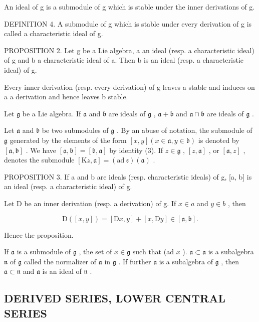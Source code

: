 An ideal of g is a submodule of g which is stable under the inner derivations of g.

DEFINITION 4. A submodule of g which is stable under every derivation of g is called a characteristic ideal of g.

PROPOSITION 2. Let g be a Lie algebra, a an ideal (resp. a characteristic ideal) of g and b a characteristic ideal of a. Then b is an ideal (resp. a characteristic ideal) of g.

Every inner derivation (resp. every derivation) of g leaves a stable and induces on a a derivation and hence leaves b stable.

Let \(\mathfrak{g}\) be a Lie algebra. If \(\mathfrak{a}\) and \(\mathfrak{b}\) are ideals of \(\mathfrak{g}\) , \(\mathfrak{a} + \mathfrak{b}\) and \(\mathfrak{a} \cap \mathfrak{b}\) are ideals of \(\mathfrak{g}\) .

Let \(\mathfrak{a}\) and \(\mathfrak{b}\) be two submodules of \(\mathfrak{g}\) . By an abuse of notation, the submodule of \(\mathfrak{g}\) generated by the elements of the form \([x,y](x\in\mathfrak{a},y\in\mathfrak{b})\) is denoted by \([\mathfrak{a},\mathfrak{b}]\) . We have \([\mathfrak{a},\mathfrak{b}] = [\mathfrak{b},\mathfrak{a}]\) by identity (3). If \(z\in\mathfrak{g}\) , \([z,\mathfrak{a}]\) , or \([\mathfrak{a},z]\) , denotes the submodule \([\mathrm{K}z,\mathfrak{a}] = (\mathrm{ad}\,z)(\mathfrak{a})\) .

PROPOSITION 3. If a and b are ideals (resp. characteristic ideals) of g, {[}a, b{]} is an ideal (resp. a characteristic ideal) of g.

Let D be an inner derivation (resp. a derivation) of g. If \(x \in a\) and \(y \in b\) , then

\[
\mathrm{D} ([ x, y ]) = [ \mathrm{D} x, y ] + [ x, \mathrm{D} y ] \in [ \mathfrak {a}, \mathfrak {b} ].
\]

Hence the proposition.

If \(\mathfrak{a}\) is a submodule of \(\mathfrak{g}\) , the set of \(x \in \mathfrak{g}\) such that (ad \(x\) ). \(\mathfrak{a} \subset \mathfrak{a}\) is a subalgebra \(\mathfrak{n}\) of \(\mathfrak{g}\) called the normalizer of \(\mathfrak{a}\) in \(\mathfrak{g}\) . If further \(\mathfrak{a}\) is a subalgebra of \(\mathfrak{g}\) , then \(\mathfrak{a} \subset \mathfrak{n}\) and \(\mathfrak{a}\) is an ideal of \(\mathfrak{n}\) .

\subsection{DERIVED SERIES, LOWER CENTRAL SERIES}

